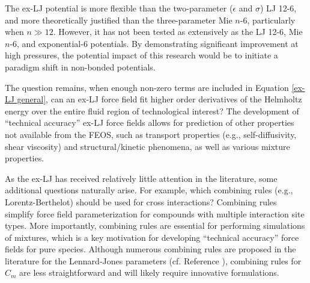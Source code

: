 \documentclass[12pt,a4paper]{article}
\begin{document}


The ex-LJ potential is more flexible than the two-parameter ($\epsilon$ and $\sigma$) LJ 12-6, and more theoretically justified than the three-parameter Mie $n$-6, particularly when $n \gg 12$. However, it has not been tested as extensively as the LJ 12-6, Mie $n$-6, and exponential-6 potentials. By demonstrating significant improvement at high pressures, the potential impact of this research would be to initiate a paradigm shift in non-bonded potentials.

The question remains, when enough non-zero terms are included in Equation \ref{ex-LJ general}, can an ex-LJ force field fit higher order derivatives of the Helmholtz energy over the entire fluid region of technological interest? The development of ``technical accuracy'' ex-LJ force fields allows for prediction of other properties not available from the FEOS, such as transport properties (e.g., self-diffusivity, shear viscosity) and structural/kinetic phenomena, as well as various mixture properties.


As the ex-LJ has received relatively little attention in the literature, some additional questions naturally arise. For example, which combining rules (e.g., Lorentz-Berthelot) should be used for cross interactions? Combining rules simplify force field parameterization for compounds with multiple interaction site types. More importantly, combining rules are essential for performing simulations of mixtures, which is a key motivation for developing ``technical accuracy'' force fields for pure species. Although numerous combining rules are proposed in the literature for the Lennard-Jones parameters (cf. Reference \cite{Schnabel2007}), combining rules for $C_m$ are less straightforward and will likely require innovative formulations.
\end{document}

